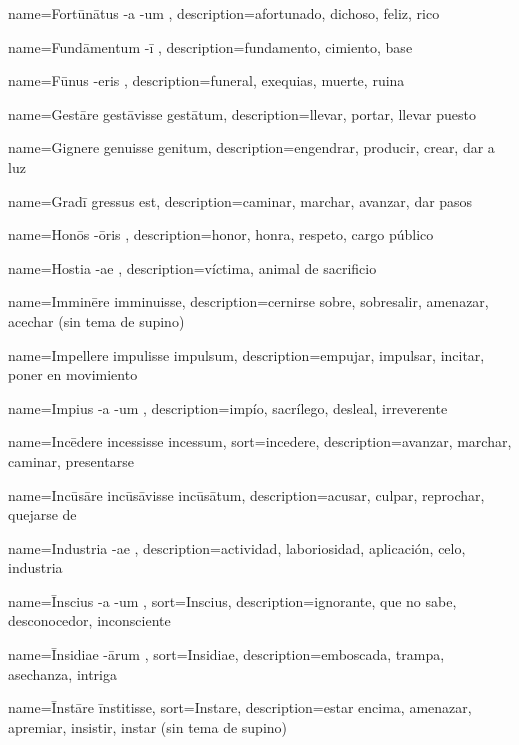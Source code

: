 {name={Fortūnātus -a -um },
description={afortunado, dichoso, feliz, rico}}

{name={Fundāmentum -ī },
description={fundamento, cimiento, base}}

{name={Fūnus -eris },
description={funeral, exequias, muerte, ruina}}

{name={Gestāre gestāvisse gestātum},
description={llevar, portar, llevar puesto}}

{name={Gignere genuisse genitum},
description={engendrar, producir, crear, dar a luz}}

{name={Gradī gressus est},
description={caminar, marchar, avanzar, dar pasos}}

{name={Honōs -ōris },
description={honor, honra, respeto, cargo público}}

{name={Hostia -ae },
description={víctima, animal de sacrificio}}

{name={Imminēre imminuisse},
description={cernirse sobre, sobresalir, amenazar, acechar (sin tema de supino)}}

{name={Impellere impulisse impulsum},
description={empujar, impulsar, incitar, poner en movimiento}}

{name={Impius -a -um },
description={impío, sacrílego, desleal, irreverente}}

{name={Incēdere incessisse incessum},
sort={incedere},
description={avanzar, marchar, caminar, presentarse}}

{name={Incūsāre incūsāvisse incūsātum},
description={acusar, culpar, reprochar, quejarse de}}

{name={Industria -ae },
description={actividad, laboriosidad, aplicación, celo, industria}}

{name={\=Inscius -a -um },
sort={Inscius},
description={ignorante, que no sabe, desconocedor, inconsciente}}

{name={\=Insidiae -ārum },
sort={Insidiae},
description={emboscada, trampa, asechanza, intriga}}

{name={\=Instāre īnstitisse},
sort={Instare},
description={estar encima, amenazar, apremiar, insistir, instar (sin tema de supino)}}

